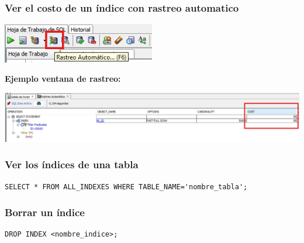 \documentclass{templateNote}
\begin{document}
\subsubsection{Ver el costo de un \'indice con rastreo automatico}
\begin{center}
    \includegraphics[width=0.5\textwidth]{img/rastreo.png}
\end{center}
\textbf{Ejemplo ventana de rastreo:}
\begin{center}
    \includegraphics[width=\textwidth]{img/rastreoresultado.png}
\end{center}
\subsubsection{Ver los \'indices de una tabla}
\begin{tcolorbox}[
    colframe=Morado!100, %
    colback=Morado!20,       %
    coltitle=white!100, %
    title=\textbf{PL/SQL}, %
]
    \begin{Verbatim}[breaklines=true]
SELECT * FROM ALL_INDEXES WHERE TABLE_NAME='nombre_tabla';
    \end{Verbatim}
\end{tcolorbox}

\subsubsection{Borrar un \'indice}
\begin{tcolorbox}[
    colframe=red!90!black, %
    colback=red!20,       %
    coltitle=white!100, %
    title=\textbf{PL/SQL}, %
]
    \begin{Verbatim}[breaklines=true]
DROP INDEX <nombre_indice>;
    \end{Verbatim}
\end{tcolorbox}
\end{document}
